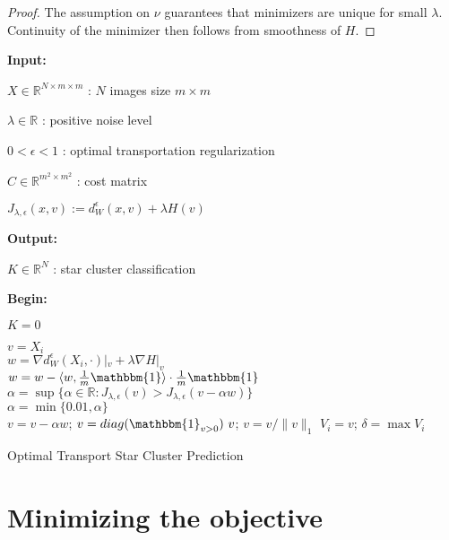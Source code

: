 \documentclass[conference]{IEEEtran}
\newcommand{\R}{{\mathbb{R}}}
\newcommand{\bbI}{{\mathbbm{1}}}
\begin{document}
\begin{proof}
    The assumption on $\nu$ guarantees that minimizers are unique for small $\lambda$. Continuity of the minimizer then follows from smoothness of $H$. 
\end{proof}

\begin{algorithm}[h]
    \textbf{Input:} 
    
    \quad $X \in \R^{N \times m \times m}$ : $N$ images size $m \times m$

    \quad $\lambda \in \R$ : positive noise level 

    \quad $0 < \epsilon < 1$ : optimal transportation regularization 

    \quad $C\in\R^{m^2 \times m^2}$ : cost matrix 

    \quad $ J_{\lambda,\epsilon}(x,v) := d_W^\epsilon(x,v) + \lambda H(v) $

    \textbf{Output:}
    
    \quad $K \in \R^N$ : star cluster classification
    
    \textbf{Begin:}
    
    $K = 0$
    
 	{
        $ v = X_i $ \\
 	    {
$w = \nabla d_W^\epsilon(X_i,\cdot)|_v + \lambda \nabla H|_v $ \\
$ w = w - \langle w, \frac{1}{m} \bbI \rangle \cdot \frac{1}{m} \bbI $ \\
$ \alpha = \sup\{\alpha \in \R : J_{\lambda,\epsilon}(v) > J_{\lambda,\epsilon}(v - \alpha w) \}$ \\
            $ \alpha = \min\{0.01, \alpha\}$\\
 	        $ v = v - \alpha w $;
 	        $ v = diag(\bbI_{v > 0}) \ v $;
 	        $ v = v/\|v\|_1 $
 	    }
 	    $V_i = v$;
     	$\delta = \max V_i$
     	
  	}
	\caption{Optimal Transport Star Cluster Prediction}
	\label{algo:star_cluster}
\end{algorithm}

\section{Minimizing the objective}
\end{document}
